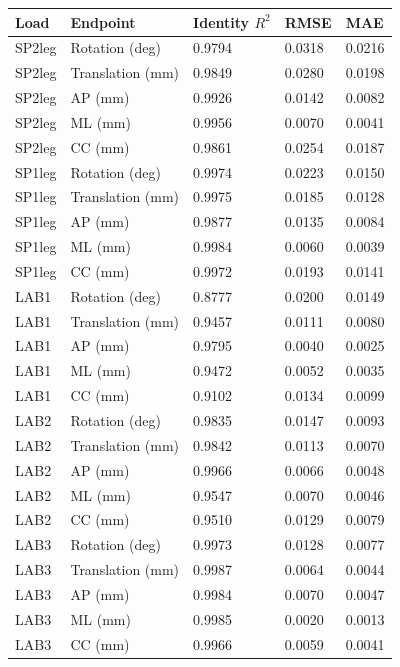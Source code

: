 \begin{tabular}{lllll}
\toprule
Load & Endpoint & Identity $R^2$ & RMSE & MAE \\
\midrule
SP2leg & Rotation (deg) & 0.9794 & 0.0318 & 0.0216 \\
SP2leg & Translation (mm) & 0.9849 & 0.0280 & 0.0198 \\
SP2leg & AP (mm) & 0.9926 & 0.0142 & 0.0082 \\
SP2leg & ML (mm) & 0.9956 & 0.0070 & 0.0041 \\
SP2leg & CC (mm) & 0.9861 & 0.0254 & 0.0187 \\
SP1leg & Rotation (deg) & 0.9974 & 0.0223 & 0.0150 \\
SP1leg & Translation (mm) & 0.9975 & 0.0185 & 0.0128 \\
SP1leg & AP (mm) & 0.9877 & 0.0135 & 0.0084 \\
SP1leg & ML (mm) & 0.9984 & 0.0060 & 0.0039 \\
SP1leg & CC (mm) & 0.9972 & 0.0193 & 0.0141 \\
LAB1 & Rotation (deg) & 0.8777 & 0.0200 & 0.0149 \\
LAB1 & Translation (mm) & 0.9457 & 0.0111 & 0.0080 \\
LAB1 & AP (mm) & 0.9795 & 0.0040 & 0.0025 \\
LAB1 & ML (mm) & 0.9472 & 0.0052 & 0.0035 \\
LAB1 & CC (mm) & 0.9102 & 0.0134 & 0.0099 \\
LAB2 & Rotation (deg) & 0.9835 & 0.0147 & 0.0093 \\
LAB2 & Translation (mm) & 0.9842 & 0.0113 & 0.0070 \\
LAB2 & AP (mm) & 0.9966 & 0.0066 & 0.0048 \\
LAB2 & ML (mm) & 0.9547 & 0.0070 & 0.0046 \\
LAB2 & CC (mm) & 0.9510 & 0.0129 & 0.0079 \\
LAB3 & Rotation (deg) & 0.9973 & 0.0128 & 0.0077 \\
LAB3 & Translation (mm) & 0.9987 & 0.0064 & 0.0044 \\
LAB3 & AP (mm) & 0.9984 & 0.0070 & 0.0047 \\
LAB3 & ML (mm) & 0.9985 & 0.0020 & 0.0013 \\
LAB3 & CC (mm) & 0.9966 & 0.0059 & 0.0041 \\
\bottomrule
\end{tabular}
